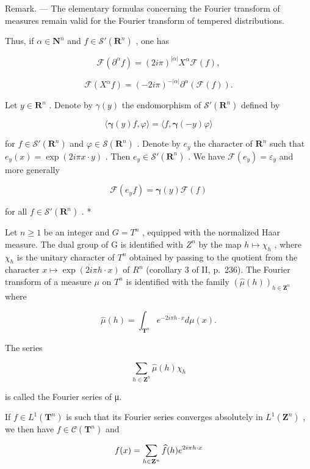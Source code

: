 Remark. --- The elementary formulas concerning the Fourier transform of measures remain valid for the Fourier transform of tempered distributions.

Thus, if \(\alpha \in \mathbf{N}^n\) and \(f\in \mathcal{S}'(\mathbf{R}^n)\) , one has

\[
\mathcal {F} (\partial^ {\alpha} f) = (2 i \pi) ^ {| \alpha |} X ^ {\alpha} \mathcal {F} (f),
\]

\[
\mathcal {F} (X ^ {\alpha} f) = (- 2 i \pi) ^ {- | \alpha |} \partial^ {\alpha} (\mathcal {F} (f)).
\]

Let \(y \in \mathbf{R}^n\) . Denote by \(\gamma(y)\) the endomorphism of \(\mathcal{S}'(\mathbf{R}^n)\) defined by

\[
\langle \boldsymbol {\gamma} (y) f, \varphi \rangle = \langle f, \boldsymbol {\gamma} (- y) \varphi \rangle
\]

for \(f \in \mathcal{S}'(\mathbf{R}^n)\) and \(\varphi \in \mathcal{S}(\mathbf{R}^n)\) . Denote by \(e_y\) the character of \(\mathbf{R}^n\) such that \(e_y(x) = \exp(2i\pi x \cdot y)\) . Then \(e_y \in \mathcal{S}'(\mathbf{R}^n)\) . We have \(\mathcal{F}(e_y) = \varepsilon_y\) and more generally

\[
\mathcal {F} (e _ {y} f) = \boldsymbol {\gamma} (y) \mathcal {F} (f)
\]

for all \(f \in \mathcal{S}'(\mathbf{R}^n)\) . *

Let \(n \geqslant 1\) be an integer and \(G = T^{n}\) , equipped with the normalized Haar measure. The dual group of G is identified with \(Z^{n}\) by the map \(h \mapsto \chi_{h}\) , where \(\chi_{h}\) is the unitary character of \(T^{n}\) obtained by passing to the quotient from the character \(x \mapsto \exp(2i\pi h \cdot x)\) of \(R^{n}\) (corollary 3 of II, p.~236). The Fourier transform of a measure \(\mu\) on \(T^{n}\) is identified with the family \((\widehat{\mu}(h))_{h \in \mathbf{Z}^{n}}\) where

\[
\widehat {\mu} (h) = \int_ {\mathbf {T} ^ {n}} e ^ {- 2 i \pi h \cdot x} d \mu (x).
\]

The series

\[
\sum_ {h \in \mathbf {Z} ^ {n}} \widehat {\mu} (h) \chi_ {h}
\]

is called the Fourier series of μ.

If \(f \in L^{1}(\mathbf{T}^{n})\) is such that its Fourier series converges absolutely in \(L^{1}(\mathbf{Z}^{n})\) , we then have \(f \in \mathcal{C}(\mathbf{T}^{n})\) and

\[
f (x) = \sum_ {h \in {\bf Z} ^ {n}} \widehat {f} (h) e ^ {2 i \pi h \cdot x}
\]


